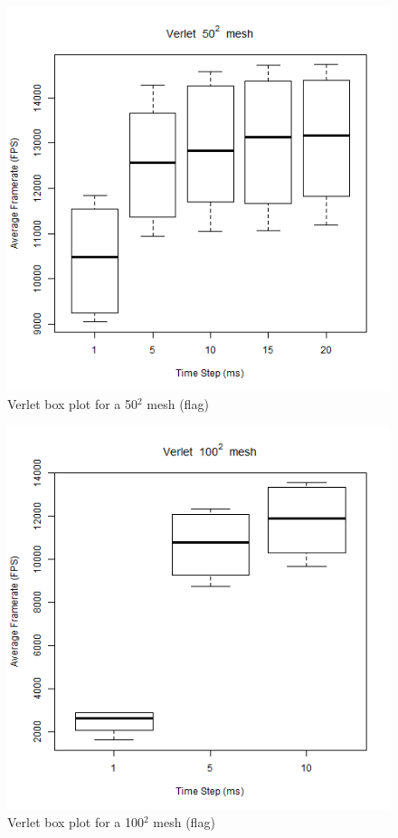     \begin{figure}
    \begin{center}
      \includegraphics[scale=.9]{Figures/flag_v_50_box}
    \end{center}
    \caption{Verlet box plot for a 50$^{2}$ mesh (flag)}
    \label{fig:v box 50 flag}
  \end{figure}
  
      \begin{figure}
    \begin{center}
      \includegraphics[scale=.9]{Figures/flag_v_100_box}
    \end{center}
    \caption{Verlet box plot for a 100$^{2}$ mesh (flag)}
    \label{fig:v box 100 flag}
  \end{figure}
  
